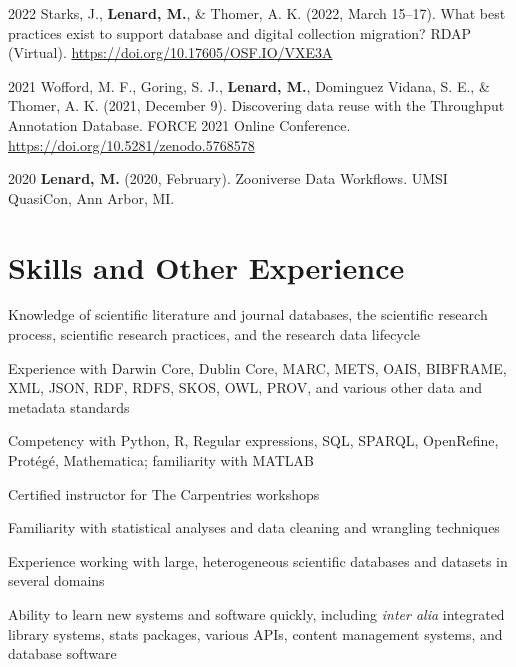 \documentclass[12pt,letterpaper]{report}
\newcommand{\listitemspace}{0.25em}
\renewenvironment{itemize}
{\begin{list}{}{\setlength{\leftmargin}{0em}
            \setlength{\parskip}{0em}
            \setlength{\itemsep}{\listitemspace}
            \setlength{\parsep}{\listitemspace}}}
{\end{list}}
\begin{document}
\begin{tablist}
    
	\item[2022] \tab Starks, J., \textbf{Lenard, M.}, \& Thomer, A. K. (2022, March 15--17). What best practices exist to support database and digital collection migration? RDAP (Virtual). \href{https://osf.io/vxe3a/}{https://doi.org/10.17605/OSF.IO/VXE3A}
	
	\item[2021] \tab Wofford, M. F., Goring, S. J., \textbf{Lenard, M.}, Dominguez Vidana, S. E., \& Thomer, A. K. (2021, December 9). Discovering data reuse with the Throughput Annotation Database. FORCE 2021 Online Conference. \href{https://doi.org/10.5281/zenodo.5768578}{https://doi.org/10.5281/zenodo.5768578}
	
	\item[2020] \tab \textbf{Lenard, M.} (2020, February). Zooniverse Data Workflows. UMSI QuasiCon, Ann Arbor, MI.

\end{tablist}



\section*{Skills and Other Experience}

\begin{itemize}

	\item Knowledge of scientific literature and journal databases, the scientific research process, scientific research practices, and the research data lifecycle
        
	\item Experience with Darwin Core, Dublin Core, MARC, METS, OAIS, BIBFRAME, XML, JSON, RDF, RDFS, SKOS, OWL, PROV, and various other data and metadata standards
        
	\item Competency with Python, R, Regular expressions, SQL, SPARQL, OpenRefine, Protégé, Mathematica; familiarity with MATLAB
	
	\item Certified instructor for The Carpentries workshops
        
	\item Familiarity with statistical analyses and data cleaning and wrangling techniques

	\item Experience working with large, heterogeneous scientific databases and datasets in several domains

	\item Ability to learn new systems and software quickly, including \textit{inter alia} integrated library systems, stats packages, various APIs, content management systems, and database software
        
\end{itemize}
\end{document}
